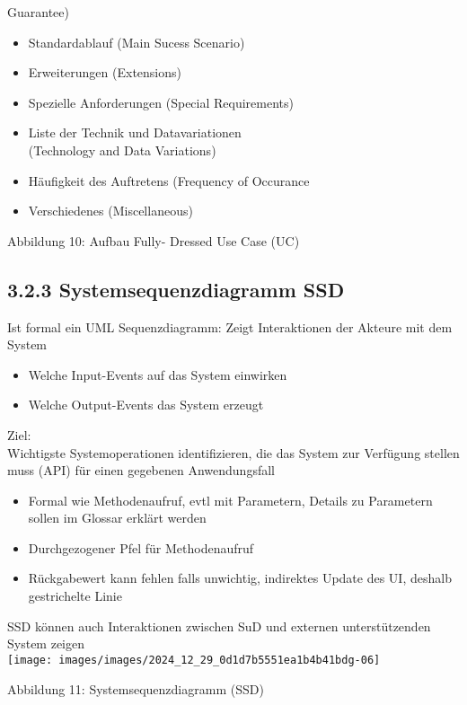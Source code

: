 Guarantee)

\begin{itemize}
  \item Standardablauf (Main Sucess Scenario)
  \item Erweiterungen (Extensions)
  \item Spezielle Anforderungen (Special Requirements)
  \item Liste der Technik und Datavariationen\\
(Technology and Data Variations)
  \item Häufigkeit des Auftretens (Frequency of Occurance
  \item Verschiedenes (Miscellaneous)
\end{itemize}

Abbildung 10: Aufbau Fully- Dressed Use Case (UC)

\subsection*{3.2.3 Systemsequenzdiagramm SSD}
Ist formal ein UML Sequenzdiagramm: Zeigt Interaktionen der Akteure mit dem System

\begin{itemize}
  \item Welche Input-Events auf das System einwirken
  \item Welche Output-Events das System erzeugt
\end{itemize}

Ziel:\\
Wichtigste Systemoperationen identifizieren, die das System zur Verfügung stellen muss (API) für einen gegebenen Anwendungsfall

\begin{itemize}
  \item Formal wie Methodenaufruf, evtl mit Parametern, Details zu Parametern sollen im Glossar erklärt werden
  \item Durchgezogener Pfel für Methodenaufruf
  \item Rückgabewert kann fehlen falls unwichtig, indirektes Update des UI, deshalb gestrichelte Linie
\end{itemize}

SSD können auch Interaktionen zwischen SuD und externen unterstützenden System zeigen\\
\texttt{[image: images/images/2024\_12\_29\_0d1d7b5551ea1b4b41bdg-06]}

Abbildung 11: Systemsequenzdiagramm (SSD)